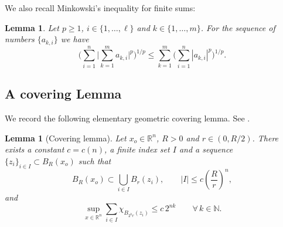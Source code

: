 \documentclass[10pt,letterpaper]{amsart}
\newtheorem{lemma}[theorem]{Lemma}
\theoremstyle{definition}
\numberwithin{theorem}{section}
\numberwithin{equation}{section}
\newcommand{\N}{\ensuremath{\mathbb{N}}}
\newcommand{\R}{\ensuremath{\mathbb{R}}}
\newcommand{\1}{\ensuremath{\mathds{1}}}
\numberwithin{equation}{section}
\begin{document}
We also recall Minkowski’s inequality for finite sums:
\begin{lemma}
Let $p\ge1$, $i\in\{1,\dots,\ell\}$ and $k\in\{1,\dots,m\}$. For the sequence of numbers $\{a_{k,i}\}$ we have
    \begin{equation}\label{eq:sum-minkowski}
\bigg( \sum_{i=1}^{n} \Big| \sum_{k=1}^{m} a_{k,i} \Big|^{p} \bigg)^{1/p}
\le
\sum_{k=1}^{m} 
\bigg( \sum_{i=1}^{n} |a_{k,i}|^{p} \bigg)^{1/p}.
\end{equation}

\end{lemma}


\subsection{A covering Lemma}
We record the following elementary geometric covering lemma. See \cite[Lemma~2.11]{DKLN-pot}.

\begin{lemma} [Covering lemma]\label{lem:covering}
Let $x_o \in \R^n$, $R> 0$ and $r \in (0, R/2)$. There exists a constant $c = c(n)$, a finite index set $I$ and a sequence $\{z_i\}_{i \in I} \subset B_R(x_o)$ such that
\begin{equation*}
B_R(x_o) \subset \bigcup_{i \in I} B_r(z_i),\qquad  |I| \leq c \left( \frac{R}{r} \right)^n,
\end{equation*}
and 
\begin{equation*}
    \sup_{x \in \R^n} \sum_{i \in I} \chi_{B_{2^k r}(z_i)} \leq c\, 2^{nk}
    \qquad \forall\, k\in\N.
\end{equation*}
\end{lemma}
\end{document}
